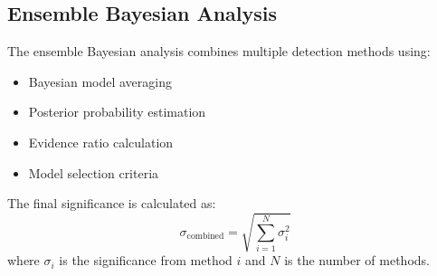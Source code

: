 \subsection{Ensemble Bayesian Analysis}

The ensemble Bayesian analysis combines multiple detection methods using:
\begin{itemize}
    \item Bayesian model averaging
    \item Posterior probability estimation
    \item Evidence ratio calculation
    \item Model selection criteria
\end{itemize}

The final significance is calculated as:
\begin{equation}
\sigma_{\text{combined}} = \sqrt{\sum_{i=1}^{N} \sigma_i^2}
\end{equation}
where $\sigma_i$ is the significance from method $i$ and $N$ is the number of methods.

